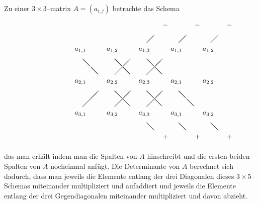 \begin{regel} Zu einer $3 \times 3$--matrix $A = \left( a_{i,j} \right)$ betrachte das Schema
$$ \setlength{\unitlength}{0.4cm}
\begin{picture}(22,16)(-4,-4)
  \put(0,0){$a_{3,1}$}
  \put(1,1){\line(1,1){2}}
  \put(0,4){$a_{2,1}$}
  \put(9,9){\line(1,1){1}}
  \put(0,8){$a_{1,1}$}
  \put(4,0){$a_{3,2}$}
  \put(5,1){\line(1,1){2}}
  \put(4,4){$a_{2,2}$}
  \put(5,5){\line(1,1){2}}
  \put(4,8){$a_{1,2}$}
  \put(8,0){$a_{3,3}$}
  \put(9,1){\line(1,1){2}}
  \put(8,4){$a_{2,3}$}
  \put(9,5){\line(1,1){2}}
  \put(8,8){$a_{1,3}$}
  \put(12,0){$a_{3,1}$}
  \put(13,9){\line(1,1){1}}
  \put(12,4){$a_{2,1}$}
  \put(17,9){\line(1,1){1}}
  \put(12,8){$a_{1,1}$}
  \put(16,0){$a_{3,2}$}
  \put(16,4){$a_{2,2}$}
  \put(16,8){$a_{1,2}$}
  \put(11,11){$-$}
  \put(15,11){$-$}
  \put(19,11){$-$}
  \put(1,7){\line(1,-1){0.9}}
  \put(2,6){\line(1,-1){0.9}}
  \put(5,3){\line(1,-1){0.9}}
  \put(6,2){\line(1,-1){0.9}}
  \put(9,-1){\line(1,-1){0.9}}
  \put(5,7){\line(1,-1){0.9}}
  \put(6,6){\line(1,-1){0.9}}
  \put(9,3){\line(1,-1){0.9}}
  \put(10,2){\line(1,-1){0.9}}
  \put(13,-1){\line(1,-1){0.9}}
  \put(9,7){\line(1,-1){0.9}}
  \put(10,6){\line(1,-1){0.9}}
  \put(13,3){\line(1,-1){0.9}}
  \put(14,2){\line(1,-1){0.9}}
  \put(17,-1){\line(1,-1){0.9}}
  \put(11,-3){$+$}
  \put(15,-3){$+$}
  \put(19,-3){$+$}
\end{picture} 
\setlength{\unitlength}{1pt}  $$
das man erhält indem man die Spalten von $A$ hinschreibt und die ersten beiden Spalten von $A$ nocheinmal 
anfügt. Die Determinante von $A$ berechnet sich dadurch, dass man jeweils die Elemente entlang der drei 
Diagonalen dieses $3 \times 5$--Schemas miteinander multipliziert und aufaddiert und jeweils die Elemente 
entlang der drei Gegendiagonalen miteinander multipliziert und davon abzieht.
\end{regel}

